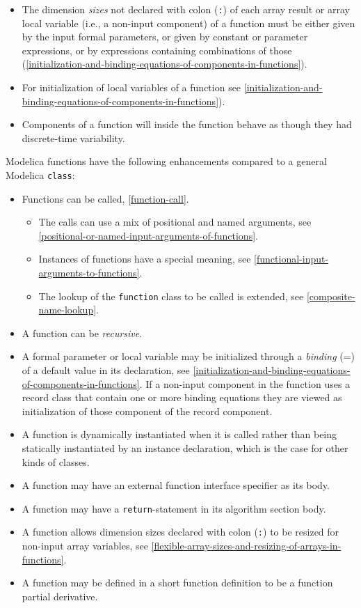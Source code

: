 \begin{itemize}
\item
  The dimension \emph{sizes} not declared with colon (\lstinline!:!) of each array result or array local variable (i.e., a non-input component) of a function must be either given by the input formal parameters, or given by constant or parameter expressions, or by expressions containing combinations of those (\cref{initialization-and-binding-equations-of-components-in-functions}).
\item
  For initialization of local variables of a function see \cref{initialization-and-binding-equations-of-components-in-functions}).
\item
  Components of a function will inside the function behave as though they had discrete-time variability.
\end{itemize}

Modelica functions have the following enhancements compared to a general Modelica \lstinline!class!:
\begin{itemize}
\item
  Functions can be called, \cref{function-call}.
  \begin{itemize}
  \item
    The calls can use a mix of positional and named arguments, see \cref{positional-or-named-input-arguments-of-functions}.
  \item
    Instances of functions have a special meaning, see \cref{functional-input-arguments-to-functions}.
  \item
    The lookup of the \lstinline!function! class to be called is extended, see \cref{composite-name-lookup}.
  \end{itemize}
\item
  A function can be \emph{recursive}.
\item
  A formal parameter or local variable may be initialized through a \emph{binding} (=) of a default value in its declaration, see \cref{initialization-and-binding-equations-of-components-in-functions}.
  If a non-input component in the function uses a record class that contain one or more binding equations they are viewed as initialization of those component of the record component.
\item
  A function is dynamically instantiated when it is called rather than being statically instantiated by an instance declaration, which is the case for other kinds of classes.
\item
  A function may have an external function interface specifier as its body.
\item
  A function may have a \lstinline!return!-statement in its algorithm section body.
\item
  A function allows dimension sizes declared with colon (\lstinline!:!) to be resized for non-input array variables, see \cref{flexible-array-sizes-and-resizing-of-arrays-in-functions}.
\item
  A function may be defined in a short function definition to be a function partial derivative.
\end{itemize}

